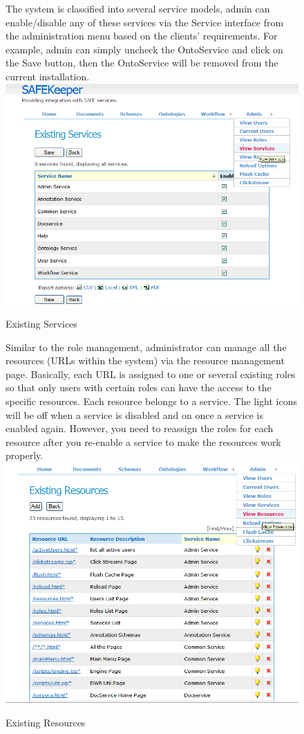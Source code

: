 \begin{figure}
The system is classified into several service models, admin can enable/disable any 
of these services via the Service interface from the administration menu based on 
the clients’ requirements. For example, admin can simply uncheck the OntoService 
and click on the Save button, then the OntoService will be removed from the current 
installation.
\includegraphics[scale=0.4]{servicelist}
\caption{Existing Services}
\label{fig:servicelist}
\end{figure}

\begin{figure}
Similar to the role management, administrator can manage all the resources 
(URLs within the system) via the resource management page. Basically, each URL 
is assigned to one or several existing roles so that only users with certain roles 
can have the access to the specific resources. Each resource belongs to a service. 
The light icons will be off when a service is disabled and on once a service is 
enabled again. However, you need to reassign the roles for each resource after 
you re-enable a service to make the resources work properly.
\includegraphics[scale=0.4]{resourcelist}
\caption{Existing Resources}
\label{fig:resourcelist}
\end{figure}

